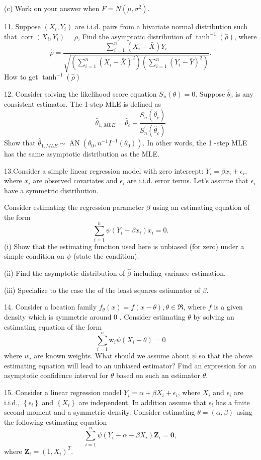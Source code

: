 \documentclass[11pt]{article}
\theoremstyle{definition}
\begin{document}
(c) Work on your answer when $F=N\left(\mu, \sigma^2\right)$.

11. Suppose $\left(X_i, Y_i\right)$ are i.i.d. pairs from a bivariate normal distribution such that $\operatorname{corr}\left(X_i, Y_i\right)=\rho$, Find the asymptotic distribution of $\tanh ^{-1}(\widehat{\rho})$, where
$$
\widehat{\rho}=\frac{\sum_{i=1}^n\left(X_i-\bar{X}\right) Y_i}{\sqrt{\left(\sum_{i=1}^n\left(X_i-\bar{X}\right)^2\right)\left(\sum_{i=1}^n\left(Y_i-\bar{Y}\right)^2\right)}} .
$$
How to get $\tanh^{-1} (\hat\rho)$

12. Consider solving the likelihood score equation $S_n(\theta)=0$. Suppose $\widehat{\theta}_c$ is any consistent estimator. The 1-step MLE is defined as
$$
\widehat{\theta}_{1, M L E}=\widehat{\theta}_c-\frac{S_n\left(\widehat{\theta}_c\right)}{S_n^{\prime}\left(\widehat{\theta}_c\right)}
$$
Show that $\widehat{\theta}_{1, M L E} \sim \operatorname{AN}\left(\theta_0, n^{-1} I^{-1}\left(\theta_0\right)\right)$. In other words, the 1 -step MLE has the same asymptotic distribution as the MLE.


13.Consider a simple linear regression model with zero intercept: $Y_i=\beta x_i+\epsilon_i$, where $x_i$ are observed covariates and $\epsilon_i$ are i.i.d. error terms. Let's assume that $\epsilon_i$ have a symmetric distribution.

Consider estimating the regression parameter $\beta$ using an estimating equation of the form
$$
\sum_{i=1}^n \psi\left(Y_i-\beta x_i\right) x_i=0 .
$$
(i) Show that the estimating function used here is unbiased (for zero) under a simple condition on $\psi$ (state the condition).

(ii) Find the asymptotic distribution of $\widehat{\beta}$ including variance estimation.

(iii) Specialize to the case the of the least squares estiumator of $\beta$.

14. Consider a location family $f_\theta(x)=f(x-\theta), \theta \in \Re$, where $f$ is a given density which is symmetric around 0 . Consider estimating $\theta$ by solving an estimating equation of the form
$$
\sum_{i=1}^n \mathrm{w}_i \psi\left(X_i-\theta\right)=0
$$
where $w_i$ are known weights. What should we assume about $\psi$ so that the above estimating equation will lead to an unbiased estimator? Find an expression for an asymptotic confidence interval for $\theta$ based on such an estimator $\widehat{\theta}$.

15. Consider a linear regression model $Y_i=\alpha+\beta X_i+\epsilon_i$, where $X_i$ and $\epsilon_i$ are i.i.d., $\left\{\epsilon_i\right\}$ and $\left\{X_i\right\}$ are independent. In addition assume that $\epsilon_i$ has a finite second moment and a symmetric density. Consider estimating $\theta=(\alpha, \beta)$ using the following estimating equation
$$
\sum_{i=1}^n \psi\left(Y_i-\alpha-\beta X_i\right) \boldsymbol{Z}_i=\mathbf{0},
$$
where $\boldsymbol{Z}_i=\left(1, X_i\right)^T$.
\end{document}

